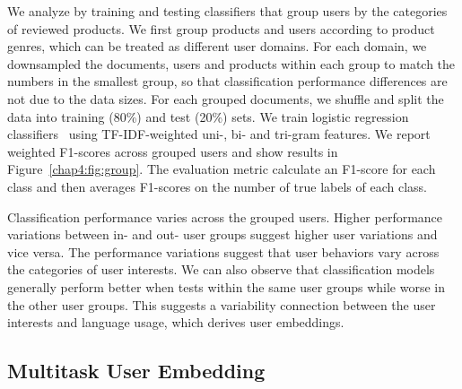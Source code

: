 We analyze by training and testing classifiers that group users by the categories of reviewed products.
We first group products and users according to product genres, which can be treated as different user domains. 
For each domain, we downsampled the documents, users and products within each group to match the numbers in the smallest group, so that classification performance differences are not due to the data sizes.
For each grouped documents, we shuffle and split the data into training (80\%) and test (20\%) sets. We train logistic regression classifiers~\cite{pedregosa2011scikit} using TF-IDF-weighted uni-, bi- and tri-gram features. 
We report weighted F1-scores across grouped users and show results in Figure~\ref{chap4:fig:group}.
The evaluation metric calculate an F1-score for each class and then averages F1-scores on the number of true labels of each class.

Classification performance varies across the grouped users.
Higher performance variations between in- and out- user groups suggest higher user variations and vice versa.
The performance variations suggest that user behaviors vary across the categories of user interests. 
We can also observe that classification models generally perform better when tests within the same user groups while worse in the other user groups.
This suggests a variability connection between the user interests and language usage, which derives user embeddings. 



\subsection{Multitask User Embedding}
\label{chap4:subsec:model2}


